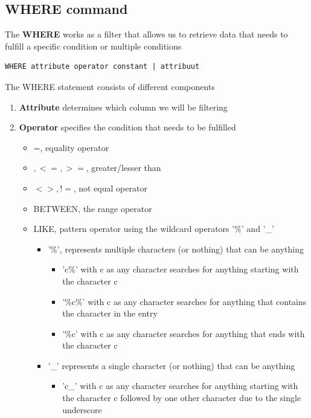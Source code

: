 \documentclass{article}
\begin{document}
\subsection{WHERE command}

The \textbf{WHERE} works as a filter that allows us to retrieve data that needs to fulfill a specific condition or multiple conditions
\begin{lstlisting}[frame=single]
    WHERE attribute operator constant | attribuut 
\end{lstlisting}

The WHERE statement consists of different components
\begin{enumerate}
    \item \textbf{Attribute} determines which column we will be filtering
    \item \textbf{Operator} specifies the condition that needs to be fulfilled
    \begin{itemize}
        \item =, equality operator 
        \item \(<,>, <=, >=\), greater/lesser than
        \item \(<>, !=\), not equal operator 
        \item BETWEEN, the range operator
        \item LIKE, pattern operator using the wildcard operators '\%' and '\_'
        \begin{itemize}
            \item '\%', represents multiple characters (or nothing) that can be anything
            \begin{itemize}
                \item 'c\%' with c as any character searches for anything starting with the character c
                \item '\%c\%' with c as any character searches for anything that contains the character in the entry
                \item '\%c' with c as any character searches for anything that ends with the character c
            \end{itemize}
            \item '\_' represents a single character (or nothing) that can be anything
            \begin{itemize}
                \item 'c\_' with c as any character searches for anything starting with the character c followed by one other character due to the single underscore

\end{itemize}
\end{itemize}
\end{itemize}
\end{enumerate}
\end{document}
